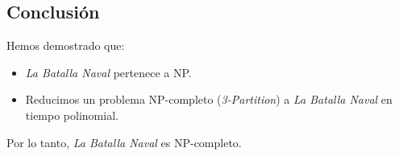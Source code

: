 \subsection*{Conclusión}

Hemos demostrado que:
\begin{itemize}
    \item \textit{La Batalla Naval} pertenece a NP.
    \item Reducimos un problema NP-completo (\textit{3-Partition}) a \textit{La Batalla Naval} en tiempo polinomial.
\end{itemize}

Por lo tanto, \textit{La Batalla Naval} es NP-completo.